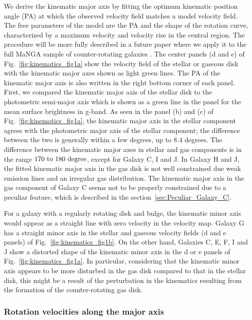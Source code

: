 \documentclass[fleqn,usenatbib]{mnras}
\begin{document}
We derive the kinematic major axis by fitting the optimum kinematic position angle (PA) 
at which the observed velocity field matches a model velocity field. 
The free parameters of the model are the PA and the shape of the rotation curve,
characterized by a maximum velocity and velocity rise in the central region. 
The procedure will be more fully described in a future paper 
where we apply it to the full MaNGA sample of counter-rotating galaxies \citep{Beom2022}.
The center panels (d and e) of Fig.~\ref{fig:kinematics_fig1a}
show the velocity field of the stellar or gaseous disk
with the kinematic major axes shown as light green lines. 
The PA of the kinematic major axis is also
written in the right bottom corner of each panel.
First, we compared the kinematic major axis of the stellar disk
to the photometric semi-major axis 
which is shown as a green line in the panel for 
the mean surface brightness in g-band.
As seen in the panel (b) and (c) of Fig.~\ref{fig:kinematics_fig1a}, 
the kinematic major axis in the stellar component agrees with 
the photometric major axis of the stellar component; 
the difference between the two is generally within a few degrees, up to 8.4 degrees.
The difference between the kinematic major axes in stellar and gas components
is in the range $\rm 170~to~180~degree$, except for Galaxy C, I and J. 
In Galaxy H and J, the fitted kinematic major axis in the gas disk
is not well constrained due weak emission lines and an irregular gas distribution.
The kinematic major axis in the gas component of Galaxy C
seems not to be properly constrained due to a peculiar feature, 
which is described in the section~\ref{sec:Peculiar_Galaxy_C}.

For a galaxy with a regularly rotating disk and bulge,
the kinematic minor axis would appear as a straight line with zero velocity in the velocity map.
Galaxy G has a straight minor axis 
in the stellar and gaseous velocity fields (d and e panels) 
of Fig.~\ref{fig:kinematics_fig1b}.
On the other hand,
Galaxies C, E, F, I and J show a distorted shape of the kinematic minor axis
in the d or e panels of Fig.~\ref{fig:kinematics_fig1a}. 
In particular, considering that 
the kinematic minor axis appears to be more disturbed
in the gas disk compared to that in the stellar disk,
this might be a result of the perturbation in the kinematics
resulting from the formation of the counter-rotating gas disk.

\subsubsection{Rotation velocities along the major axis}
\label{sec:Rotation_velocities}
\end{document}
